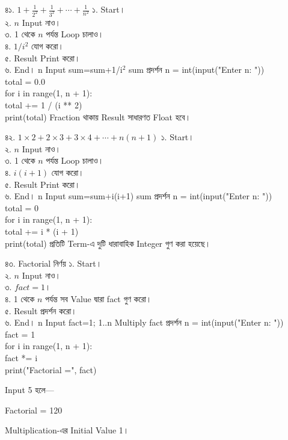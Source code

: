 
\exerciseTable
{৪১. \(1+\frac{1}{2^2}+\frac{1}{3^2}+\cdots+\frac{1}{n^2}\)}
{
১. Start।\\
২. \(n\) Input নাও।\\
৩. 1 থেকে \(n\) পর্যন্ত Loop চালাও।\\
৪. \(1/i^2\) যোগ করো।\\
৫. Result Print করো।\\
৬. End।
}
{
\linearflow
{n Input}
{sum=sum+1/i\(^2\)}
{sum প্রদর্শন}
}
{
n = int(input("Enter n: "))\\
total = 0.0\\
for i in range(1, n + 1):\\
\hspace*{4mm}total += 1 / (i ** 2)\\
print(total)
}
{
Fraction থাকায় Result সাধারণত Float হবে।
}


\exerciseTable
{৪২. \(1\times2+2\times3+3\times4+\cdots+n(n+1)\)}
{
১. Start।\\
২. \(n\) Input নাও।\\
৩. 1 থেকে \(n\) পর্যন্ত Loop চালাও।\\
৪. \(i(i+1)\) যোগ করো।\\
৫. Result Print করো।\\
৬. End।
}
{
\linearflow
{n Input}
{sum=sum+i(i+1)}
{sum প্রদর্শন}
}
{
n = int(input("Enter n: "))\\
total = 0\\
for i in range(1, n + 1):\\
\hspace*{4mm}total += i * (i + 1)\\
print(total)
}
{
প্রতিটি Term-এ দুটি ধারাবাহিক Integer গুণ করা হয়েছে।
}


\exerciseTable
{৪৩. Factorial নির্ণয়}
{
১. Start।\\
২. \(n\) Input নাও।\\
৩. \(fact=1\)।\\
৪. 1 থেকে \(n\) পর্যন্ত সব Value দ্বারা fact গুণ করো।\\
৫. Result প্রদর্শন করো।\\
৬. End।
}
{
\linearflow
{n Input}
{fact=1; 1..n Multiply}
{fact প্রদর্শন}
}
{
n = int(input("Enter n: "))\\
fact = 1\\
for i in range(1, n + 1):\\
\hspace*{4mm}fact *= i\\
print("Factorial =", fact)
}
{
Input 5 হলে—

\textenglish{\ttfamily Factorial = 120}

\medskip

Multiplication-এর Initial Value 1।
}

